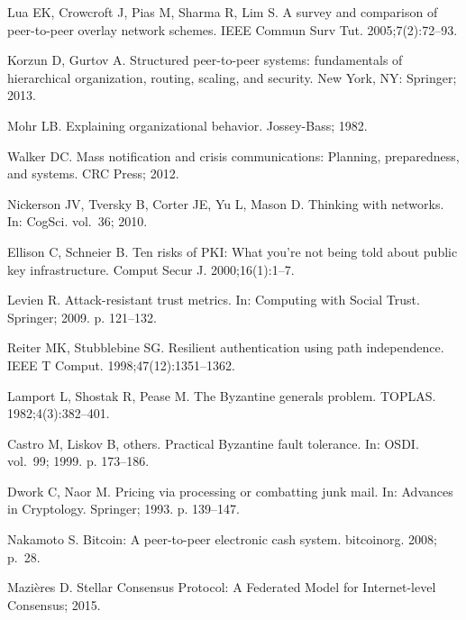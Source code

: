 \documentclass[10pt,letterpaper]{article}
\begin{document}
\begin{thebibliography}{10}
Lua EK, Crowcroft J, Pias M, Sharma R, Lim S.
\newblock A survey and comparison of peer-to-peer overlay network schemes.
\newblock IEEE Commun Surv Tut. 2005;7(2):72--93.

Korzun D, Gurtov A.
\newblock Structured peer-to-peer systems: fundamentals of hierarchical
  organization, routing, scaling, and security.
\newblock New York, NY: Springer; 2013.

Mohr LB.
\newblock Explaining organizational behavior.
\newblock Jossey-Bass; 1982.

Walker DC.
\newblock Mass notification and crisis communications: {Planning},
  preparedness, and systems.
\newblock CRC Press; 2012.

Nickerson JV, Tversky B, Corter JE, Yu L, Mason D.
\newblock Thinking with networks.
\newblock In: {CogSci}. vol.~36; 2010.

Ellison C, Schneier B.
\newblock Ten risks of {PKI}: {What} you're not being told about public key
  infrastructure.
\newblock Comput Secur J. 2000;16(1):1--7.

Levien R.
\newblock Attack-resistant trust metrics.
\newblock In: Computing with {Social} {Trust}. Springer; 2009. p. 121--132.

Reiter MK, Stubblebine SG.
\newblock Resilient authentication using path independence.
\newblock IEEE T Comput. 1998;47(12):1351--1362.

Lamport L, Shostak R, Pease M.
\newblock The {Byzantine} generals problem.
\newblock TOPLAS. 1982;4(3):382--401.

Castro M, Liskov B, {others}.
\newblock Practical {Byzantine} fault tolerance.
\newblock In: {OSDI}. vol.~99; 1999. p. 173--186.

Dwork C, Naor M.
\newblock Pricing via processing or combatting junk mail.
\newblock In: Advances in {Cryptology}. Springer; 1993. p. 139--147.

Nakamoto S.
\newblock Bitcoin: {A} peer-to-peer electronic cash system.
\newblock bitcoinorg. 2008; p.~28.

Mazières D.
\newblock Stellar {Consensus} {Protocol}: {A} {Federated} {Model} for
  {Internet}-level {Consensus}; 2015.


\end{thebibliography}
\end{document}
